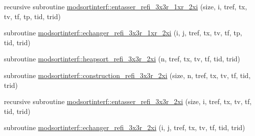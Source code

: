 \begin{DoxyCompactItemize}
\item 
recursive subroutine \hyperlink{namespacemodsortinterf_a0f52d0bfff8c94a0ecd39bc4140440f7}{modsortinterf\+::entasser\+\_\+refi\+\_\+3x3r\+\_\+1xr\+\_\+2xi} (size, i, tref, tx, tv, tf, tp, tid, trid)
\item 
subroutine \hyperlink{namespacemodsortinterf_a532d415d4356c7063bbe4c307d66c2d4}{modsortinterf\+::echanger\+\_\+refi\+\_\+3x3r\+\_\+1xr\+\_\+2xi} (i, j, tref, tx, tv, tf, tp, tid, trid)
\item 
subroutine \hyperlink{namespacemodsortinterf_ab0689c4b525c7b9a1ef10a4dc3ab05ec}{modsortinterf\+::heapsort\+\_\+refi\+\_\+3x3r\+\_\+2xi} (n, tref, tx, tv, tf, tid, trid)
\item 
subroutine \hyperlink{namespacemodsortinterf_a5963b630f754f50c34e642e7003f1ec7}{modsortinterf\+::construction\+\_\+refi\+\_\+3x3r\+\_\+2xi} (size, n, tref, tx, tv, tf, tid, trid)
\item 
recursive subroutine \hyperlink{namespacemodsortinterf_a3940381bb819de48a45d458bc9c8abc0}{modsortinterf\+::entasser\+\_\+refi\+\_\+3x3r\+\_\+2xi} (size, i, tref, tx, tv, tf, tid, trid)
\item 
subroutine \hyperlink{namespacemodsortinterf_affef71a681160070885ed763b56f16bf}{modsortinterf\+::echanger\+\_\+refi\+\_\+3x3r\+\_\+2xi} (i, j, tref, tx, tv, tf, tid, trid)
\end{DoxyCompactItemize}
